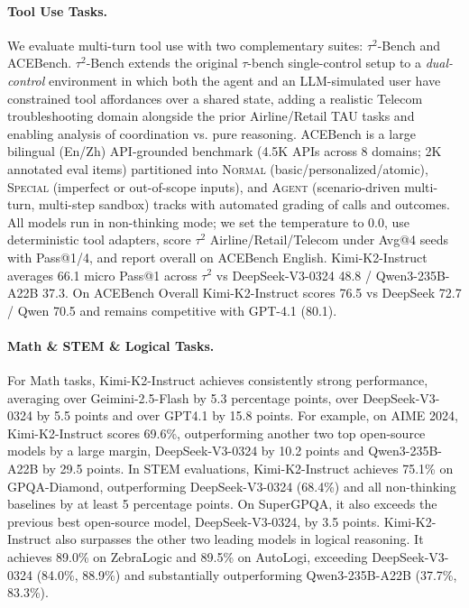 \paragraph{Tool Use Tasks.}
We evaluate multi-turn tool use with two complementary suites: $\tau^2$-Bench and ACEBench. $\tau^2$-Bench  extends the original $\tau$-bench single-control setup to a \emph{dual-control} environment in which both the agent and an LLM-simulated user have constrained tool affordances over a shared state, adding a realistic Telecom troubleshooting domain alongside the prior Airline/Retail TAU tasks and enabling analysis of coordination vs. pure reasoning. ACEBench is a large bilingual (En/Zh) API-grounded benchmark (4.5K APIs across 8 domains; 2K annotated eval items) partitioned into \textsc{Normal} (basic/personalized/atomic), \textsc{Special} (imperfect or out-of-scope inputs), and \textsc{Agent} (scenario-driven multi-turn, multi-step sandbox) tracks with automated grading of calls and outcomes. All models run in non-thinking mode; we set the temperature to 0.0, use deterministic tool adapters, score $\tau^2$ Airline/Retail/Telecom under Avg@4 seeds with Pass@1/4, and report overall on ACEBench English. Kimi-K2-Instruct averages {66.1} micro Pass@1 across $\tau^2$ vs DeepSeek-V3-0324 {48.8} / Qwen3-235B-A22B {37.3}. On ACEBench Overall Kimi-K2-Instruct scores {76.5} vs DeepSeek 72.7 / Qwen 70.5 and remains competitive with GPT-4.1 (80.1). 

\paragraph{Math \& STEM \& Logical Tasks.}
{For Math tasks, Kimi-K2-Instruct achieves consistently strong performance, averaging over Geimini-2.5-Flash by 5.3 percentage points, over DeepSeek-V3-0324 by 5.5 points and over GPT4.1 by 15.8 points. For example, on AIME 2024, Kimi-K2-Instruct scores 69.6\%, outperforming another two top open-source models by a large margin, DeepSeek-V3-0324 by 10.2 points and Qwen3-235B-A22B by 29.5 points. In STEM evaluations, Kimi-K2-Instruct achieves 75.1\% on GPQA-Diamond, outperforming DeepSeek-V3-0324 (68.4\%) and all non-thinking baselines by at least 5 percentage points. On SuperGPQA, it also exceeds the previous best open-source model, DeepSeek-V3-0324, by 3.5 points. Kimi-K2-Instruct also surpasses the other two leading models in logical reasoning. It achieves 89.0\% on ZebraLogic and 89.5\% on AutoLogi, exceeding DeepSeek-V3-0324 (84.0\%, 88.9\%) and substantially outperforming Qwen3-235B-A22B (37.7\%, 83.3\%). 

}

